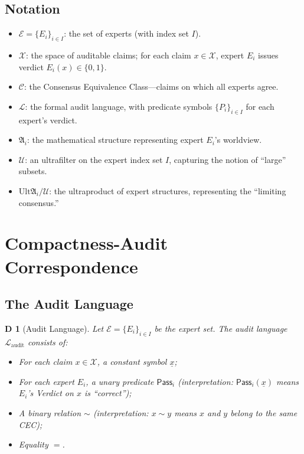 \documentclass[12pt,a4paper]{article}
\newtheorem{definition}[theorem]Definition
\theoremstyle{remark}
\newcommand{\ExpertSet}{\mathcal{E}}
\newcommand{\CEC}{\mathcal{C}}
\newcommand{\ClaimSpace}{\mathcal{X}}
\newcommand{\Lang}{\mathcal{L}}
\newcommand{\Ult}{\mathrm{Ult}}
\newcommand{\Ultrafilter}{\mathcal{U}}
\newcommand{\Struct}{\mathfrak{A}}
\begin{document}
\subsection{Notation}
\begin{itemize}[itemsep=3pt]
    \item \(\ExpertSet = \{E_i\}_{i \in I}\): the set of experts (with index set \(I\)).
    \item \(\ClaimSpace\): the space of auditable claims; for each claim \(x \in \ClaimSpace\), expert \(E_i\) issues verdict \(E_i(x) \in \{0,1\}\).
    \item \(\CEC\): the Consensus Equivalence Class---claims on which all experts agree.
    \item \(\Lang\): the formal audit language, with predicate symbols \(\{P_i\}_{i \in I}\) for each expert's verdict.
    \item \(\Struct_i\): the mathematical structure representing expert \(E_i\)'s worldview.
    \item \(\Ultrafilter\): an ultrafilter on the expert index set \(I\), capturing the notion of ``large'' subsets.
    \item \(\Ult \Struct_i / \Ultrafilter\): the ultraproduct of expert structures, representing the ``limiting consensus.''
\end{itemize}
\section{Compactness-Audit Correspondence}
\subsection{The Audit Language}
\begin{definition}[Audit Language]
Let \(\ExpertSet = \{E_i\}_{i \in I}\) be the expert set. The audit language \(\Lang_{\mathrm{audit}}\) consists of:
\begin{itemize}[itemsep=2pt]
    \item For each claim \(x \in \ClaimSpace\), a constant symbol \(\underline{x}\);
    \item For each expert \(E_i\), a unary predicate \(\mathsf{Pass}_i\) (interpretation: \(\mathsf{Pass}_i(\underline{x})\) means \(E_i\)'s Verdict on \(x\) is ``correct'');
    \item A binary relation \(\sim\) (interpretation: \(x \sim y\) means \(x\) and \(y\) belong to the same CEC);
    \item Equality \(=\).
\end{itemize}
\end{definition}
\end{document}
